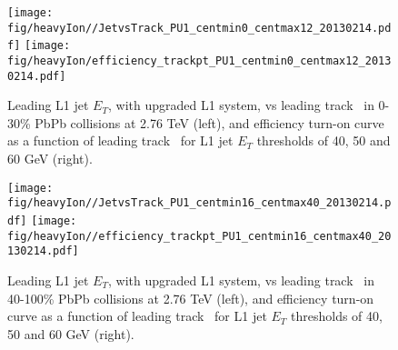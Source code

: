 \begin{figure}[!ht]
\begin{center}
\texttt{[image: fig/heavyIon//JetvsTrack\_PU1\_centmin0\_centmax12\_20130214.pdf]}
\texttt{[image: fig/heavyIon/efficiency\_trackpt\_PU1\_centmin0\_centmax12\_20130214.pdf]}
\caption{Leading L1 jet $E_T$, with upgraded L1 system, vs leading track
\pt\ in 0-30\% PbPb collisions
at 2.76 TeV (left), and efficiency turn-on curve as a function of leading
track \pt\ for L1 jet $E_T$
thresholds of 40, 50 and 60 GeV (right).}
\label{fig:trigEff_track2015_central}
\end{center}
\end{figure}

\begin{figure}[!ht]
\begin{center}
\texttt{[image: fig/heavyIon//JetvsTrack\_PU1\_centmin16\_centmax40\_20130214.pdf]}
\texttt{[image: fig/heavyIon//efficiency\_trackpt\_PU1\_centmin16\_centmax40\_20130214.pdf]}
\caption{Leading L1 jet $E_T$, with upgraded L1 system, vs leading track
\pt\ in 40-100\% PbPb collisions
at 2.76 TeV (left), and efficiency turn-on curve as a function of leading
track \pt\ for L1 jet $E_T$
thresholds of 40, 50 and 60 GeV (right).}
\label{fig:trigEff_track2015_peripheral}
\end{center}
\end{figure}
